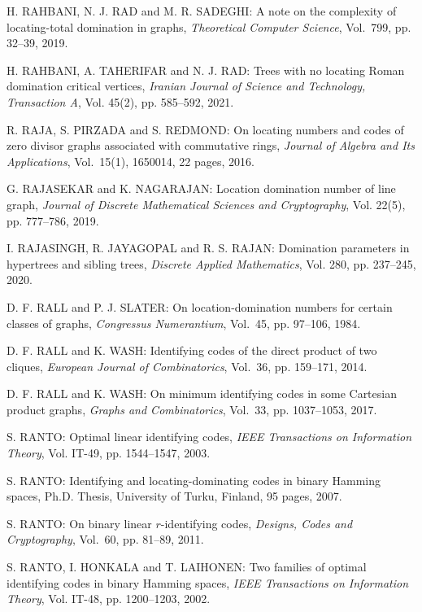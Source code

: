 \begin{thebibliography}{999}
H. RAHBANI, N. J. RAD and M. R. SADEGHI: A note on the complexity of locating-total domination in graphs, {\it Theoretical Computer Science}, Vol.~799, pp. 32--39, 2019.

H. RAHBANI, A. TAHERIFAR and N. J. RAD: Trees with no locating Roman domination critical vertices, {\it Iranian Journal of Science and Technology, Transaction A}, Vol. 45(2), pp. 585--592, 2021.

R. RAJA, S. PIRZADA and S. REDMOND: On locating numbers and codes of zero divisor graphs associated with commutative rings, {\it Journal of Algebra and Its Applications}, Vol.~15(1), 1650014, 22 pages, 2016.

G. RAJASEKAR and K. NAGARAJAN: Location domination number of line graph, {\it Journal of Discrete Mathematical Sciences and Cryptography}, Vol. 22(5), pp. 777--786, 2019.

I. RAJASINGH, R. JAYAGOPAL and R. S. RAJAN: Domination parameters in hypertrees and sibling trees, {\it Discrete Applied Mathematics}, Vol. 280, pp. 237--245, 2020.

D. F. RALL and P. J. SLATER: On location-domination numbers for certain classes of graphs, {\it Congressus Numerantium}, Vol.~45, pp. 97--106, 1984.

D. F. RALL and K. WASH: Identifying codes of the direct product of two cliques, {\it European Journal of Combinatorics}, Vol.~36, pp. 159--171, 2014.

D. F. RALL and K. WASH: On minimum identifying codes in some Cartesian product graphs, {\it Graphs and Combinatorics}, Vol.~33, pp. 1037--1053, 2017.

S. RANTO: Optimal linear identifying codes, {\it IEEE Transactions on Information Theory}, Vol. IT-49, pp. 1544--1547, 2003.

S. RANTO: Identifying and locating-dominating codes in binary Hamming spaces, Ph.D. Thesis, University of Turku, Finland, 95 pages, 2007.

S. RANTO: On binary linear $r$-identifying codes, {\it Designs, Codes and Cryptography}, Vol.~60, pp. 81--89, 2011.

S. RANTO, I. HONKALA and T. LAIHONEN: Two families of optimal identifying codes in binary Hamming spaces, {\it IEEE Transactions on Information Theory}, Vol. IT-48, pp. 1200--1203, 2002. 


\end{thebibliography}
